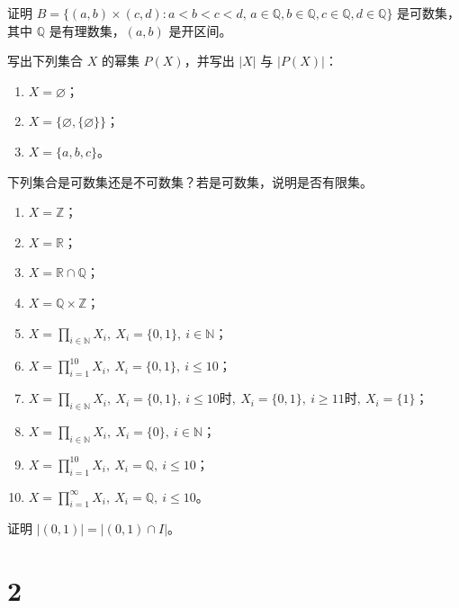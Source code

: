 \begin{homework}[1.16]
证明 $B=\{(a,b)\times (c,d): a<b<c<d,\, a\in \mathbb{Q}, b\in \mathbb{Q}, c\in \mathbb{Q}, d\in \mathbb{Q}\}$ 是可数集，其中 $\mathbb{Q}$ 是有理数集，$(a,b)$ 是开区间。
\end{homework}

\begin{homework}[1.17]
写出下列集合 $X$ 的幂集 $P(X)$，并写出 $|X|$ 与 $|P(X)|$：
\begin{enumerate}[(1)]
  \item $X = \varnothing$；
  \item $X = \{\varnothing, \{\varnothing\}\}$；
  \item $X = \{a,b,c\}$。
\end{enumerate}
\end{homework}

\begin{homework}[1.18]
下列集合是可数集还是不可数集？若是可数集，说明是否有限集。
\begin{enumerate}[(1)]
  \item $X = \mathbb{Z}$；
  \item $X = \mathbb{R}$；
  \item $X = \mathbb{R}\cap \mathbb{Q}$；
  \item $X = \mathbb{Q}\times \mathbb{Z}$；
  \item $X = \prod_{i\in\mathbb{N}} X_i, \ X_i=\{0,1\},\ i\in\mathbb{N}$；
  \item $X = \prod_{i=1}^{10} X_i, \ X_i=\{0,1\},\ i\leq 10$；
  \item $X = \prod_{i\in\mathbb{N}} X_i, \ X_i=\{0,1\},\ i\leq 10 \text{时},\ X_i=\{0,1\},\ i\geq 11 \text{时},\ X_i=\{1\}$；
  \item $X = \prod_{i\in\mathbb{N}} X_i, \ X_i=\{0\},\ i\in\mathbb{N}$；
  \item $X = \prod_{i=1}^{10} X_i, \ X_i=\mathbb{Q},\ i\leq 10$；
  \item $X = \prod_{i=1}^{\infty} X_i, \ X_i=\mathbb{Q},\ i\leq 10$。
\end{enumerate}
\end{homework}

\begin{homework}[1.19]
证明 $|(0,1)| = |(0,1)\cap I|$。
\end{homework}
\chapter{2}

